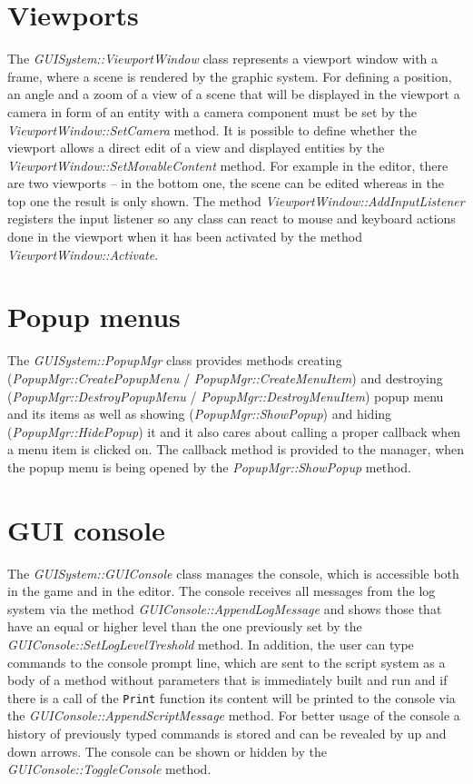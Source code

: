 \documentclass[a4paper, 12pt]{report}
\begin{document}
\section{Viewports}

The \emph{GUISystem::ViewportWindow} class represents a viewport window with a frame, where a scene is rendered by the graphic system. For defining a position, an angle and a zoom of a view of a scene that will be displayed in the viewport a camera in form of an entity with a camera component must be set by the \emph{ViewportWindow::SetCamera} method. It is possible to define whether the viewport allows a direct edit of a view and displayed entities by the \emph{ViewportWindow::SetMovableContent} method. For example in the editor, there are two viewports -- in the bottom one, the scene can be edited whereas in the top one the result is only shown. The method \emph{ViewportWindow::AddInputListener} registers the input listener so any class can react to mouse and keyboard actions done in the viewport when it has been activated by the method \emph{ViewportWindow::Activate}.

\section{Popup menus}

The \emph{GUISystem::PopupMgr} class provides methods creating (\emph{Popup\-Mgr\-::\-Create\-Popup\-Menu} / \emph{PopupMgr::CreateMenuItem}) and destroying (\emph{PopupMgr::DestroyPopupMenu} / \emph{PopupMgr::DestroyMenuItem}) popup menu and its items as well as showing (\emph{PopupMgr::ShowPopup}) and hiding (\emph{PopupMgr::HidePopup}) it and it also cares about calling a proper callback when a menu item is clicked on. The callback method is provided to the manager, when the popup menu is being opened by the \emph{PopupMgr::ShowPopup} method.

\section{GUI console}
\label{sec:gui-console}

The \emph{GUISystem::GUIConsole} class manages the console, which is accessible both in the game and in the editor. The console receives all messages from the log system via the method \emph{GUIConsole::AppendLogMessage} and shows those that have an equal or higher level than the one previously set by the \emph{GUIConsole::SetLogLevelTreshold} method. In addition, the user can type commands to the console prompt line, which are sent to the script system as a body of a method without parameters that is immediately built and run and if there is a call of the \verb/Print/ function its content will be printed to the console via the \emph{GUIConsole::AppendScriptMessage} method. For better usage of the console a history of previously typed commands is stored and can be revealed by up and down arrows. The console can be shown or hidden by the \emph{GUIConsole::ToggleConsole} method.
\end{document}
